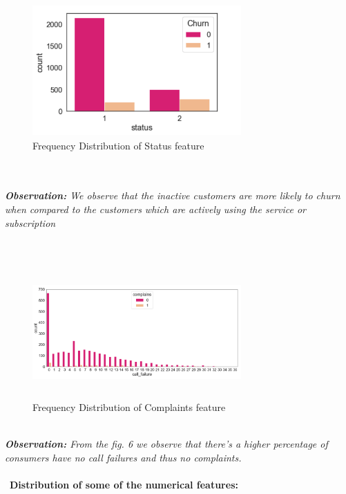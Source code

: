 \documentclass[a4paper, 10pt, conference]{ieeeconf}      %
\begin{document}
\begin{figure}[htp]
    \centering
    \includegraphics[width=8cm,height=5cm]{Images/Status.png}
    \caption{Frequency Distribution of Status feature}
    \label{fig:frequencyDistribution}
\end{figure}
\\\
\\\textit{\textbf{Observation:} We observe that the inactive customers are more likely to churn when compared to the customers which are actively using the service or subscription}
\\\
\\\
\begin{figure}[htp]
    \centering
    \includegraphics[width=8cm,height=5cm]{Images/call_failure.png}
    \caption{Frequency Distribution of Complaints feature}
    \label{fig:frequencyDistribution}
\end{figure}

 \\\textit{\textbf{Observation:} From the fig. 6 we observe that there's a higher percentage of consumers have no call failures and thus no complaints.}
 \\
 \\\
\textbf{Distribution of some of the numerical features:}
\end{document}
